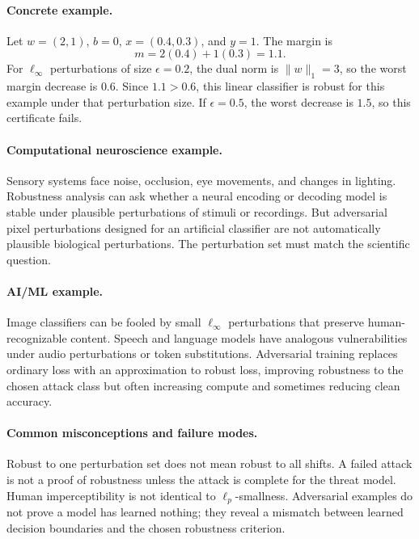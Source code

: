 \paragraph{Concrete example.}
Let \(w=(2,1)\), \(b=0\), \(x=(0.4,0.3)\), and \(y=1\). The margin is
\[
m=2(0.4)+1(0.3)=1.1.
\]
For \(\ell_\infty\) perturbations of size \(\epsilon=0.2\), the dual norm is \(\|w\|_1=3\), so the worst margin decrease is \(0.6\). Since \(1.1>0.6\), this linear classifier is robust for this example under that perturbation size. If \(\epsilon=0.5\), the worst decrease is \(1.5\), so this certificate fails.

\paragraph{Computational neuroscience example.}
Sensory systems face noise, occlusion, eye movements, and changes in lighting. Robustness analysis can ask whether a neural encoding or decoding model is stable under plausible perturbations of stimuli or recordings. But adversarial pixel perturbations designed for an artificial classifier are not automatically plausible biological perturbations. The perturbation set must match the scientific question.

\paragraph{AI/ML example.}
Image classifiers can be fooled by small \(\ell_\infty\) perturbations that preserve human-recognizable content. Speech and language models have analogous vulnerabilities under audio perturbations or token substitutions. Adversarial training replaces ordinary loss with an approximation to robust loss, improving robustness to the chosen attack class but often increasing compute and sometimes reducing clean accuracy.

\paragraph{Common misconceptions and failure modes.}
Robust to one perturbation set does not mean robust to all shifts. A failed attack is not a proof of robustness unless the attack is complete for the threat model. Human imperceptibility is not identical to \(\ell_p\)-smallness. Adversarial examples do not prove a model has learned nothing; they reveal a mismatch between learned decision boundaries and the chosen robustness criterion.

